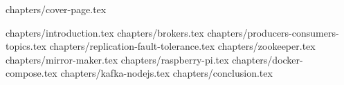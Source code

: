 \documentclass[a4paper,12pt]{article}
\begin{document}
 
 
 
{chapters/cover-page.tex}

\tableofcontents
\clearpage

{chapters/introduction.tex}
{chapters/brokers.tex}
{chapters/producers-consumers-topics.tex}
{chapters/replication-fault-tolerance.tex}
{chapters/zookeeper.tex}
{chapters/mirror-maker.tex}
{chapters/raspberry-pi.tex}
{chapters/docker-compose.tex}
{chapters/kafka-nodejs.tex}
{chapters/conclusion.tex}
 


\end{document}
